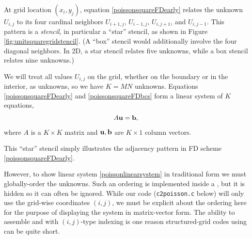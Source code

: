 At grid location $(x_i,y_j)$, equation \eqref{poissonsquareFDearly} relates the unknown $U_{i,j}$ to its four cardinal neighbors $U_{i+1,j}$, $U_{i-1,j}$, $U_{i,j+1}$, and $U_{i,j-1}$.  This pattern is a \emph{stencil}, in particular a ``star'' stencil, as shown in Figure \ref{fig:unitsquaregridstencil}.  (A ``box'' stencil would additionally involve the four diagonal neighbors.  In 2D, a star stencil relates five unknowns, while a box stencil relates nine unknowns.)

We will treat all values $U_{i,j}$ on the grid, whether on the boundary or in the interior, as unknowns, so we have $K=MN$ unknowns.  Equations \eqref{poissonsquareFDearly} and \eqref{poissonsquareFDbcs} form a linear system of $K$ equations,
\begin{equation}
A \mathbf{u} = \mathbf{b}, \label{poissonlinearsystem}
\end{equation}
where $A$ is a $K\times K$ matrix and $\mathbf{u},\mathbf{b}$ are $K\times 1$ column vectors.

\begin{marginfigure}
\caption{This ``star'' stencil simply illustrates the adjacency pattern in FD scheme \eqref{poissonsquareFDearly}.}
\label{fig:unitsquaregridstencil}
\end{marginfigure}

However, to show linear system \eqref{poissonlinearsystem} in traditional form we must globally-order the unknowns.  Such an ordering is implemented inside a \PETSc \pDMDA, but it is hidden so it can often be ignored.  While our code (\texttt{c2poisson.c} below) will only use the grid-wise coordinates $(i,j)$, we must be explicit about the ordering here for the purpose of displaying the system in matrix-vector form.  The ability to assemble \pMats and \pVecs with $(i,j)$-type indexing is one reason structured-grid codes using \pDMDA can be quite short.

